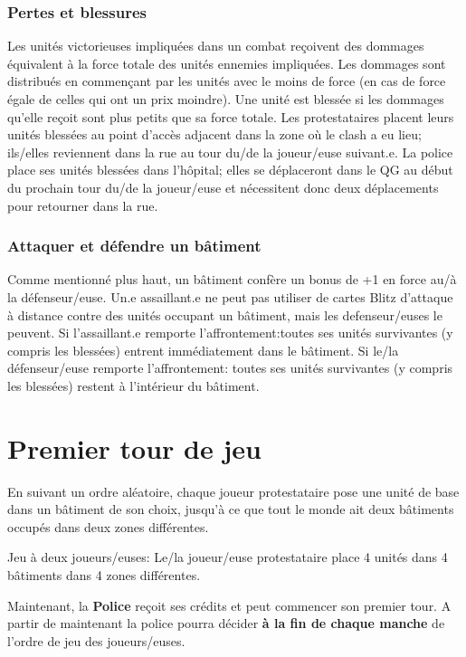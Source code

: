 \documentclass[a4paper,13pt]{scrartcl}
\begin{document}
\subsubsection*{Pertes et blessures}
Les unités victorieuses impliquées dans un combat reçoivent des dommages équivalent à la force totale des unités ennemies impliquées. Les dommages sont distribués en commençant par les unités avec le moins de force (en cas de force égale de celles qui ont un prix moindre). Une unité est blessée si les dommages qu'elle reçoit sont plus petits que sa force totale.
Les protestataires placent leurs unités blessées au point d'accès adjacent dans la zone où le clash a eu lieu; ils/elles reviennent dans la rue au tour du/de la joueur/euse suivant.e. La police place ses unités blessées dans l’hôpital; elles se déplaceront dans le QG au début du prochain tour du/de la joueur/euse et nécessitent donc deux déplacements pour retourner dans la rue.

\subsubsection*{Attaquer et défendre un bâtiment}
Comme mentionné plus haut, un bâtiment confère un bonus de +1 en force au/à la défenseur/euse.
Un.e assaillant.e ne peut pas utiliser de cartes Blitz d'attaque à distance contre des unités occupant un bâtiment, mais les defenseur/euses le peuvent.
Si l'assaillant.e remporte l'affrontement:toutes ses unités survivantes (y compris les blessées) entrent immédiatement dans le bâtiment.
Si le/la défenseur/euse remporte l'affrontement: toutes ses unités survivantes (y compris les blessées) restent à l'intérieur du bâtiment.

\section*{Premier tour de jeu}
En suivant un ordre aléatoire, chaque joueur protestataire pose une unité de base dans un bâtiment de son choix, jusqu'à ce que tout le monde ait deux bâtiments occupés dans deux zones différentes.

Jeu à deux joueurs/euses: Le/la joueur/euse protestataire place 4 unités dans 4 bâtiments dans 4 zones différentes.

Maintenant, la \textbf{Police} reçoit ses crédits et peut commencer son premier tour. A partir de maintenant la police pourra décider \textbf{à la fin de chaque manche} de l'ordre de jeu des joueurs/euses.
\end{document}
